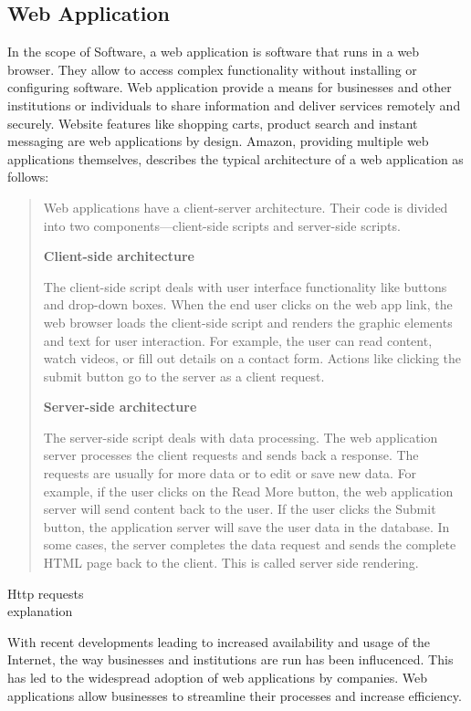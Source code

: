 \subsection{Web Application}
In the scope of Software, a web application is software that runs in a web browser. 
They allow to access complex functionality without installing or configuring software. 
Web application provide a means for businesses and other institutions or individuals to share information and deliver services remotely and securely. 
Website features like shopping carts, product search and instant messaging are web applications by design. \cite{aws/webapp}
Amazon, providing multiple web applications themselves, describes the typical architecture of a web application as follows: 
\begin{quote}
Web applications have a client-server architecture. 
Their code is divided into two components—client-side scripts and server-side scripts.  


\textbf{Client-side architecture}


The client-side script deals with user interface functionality like buttons and drop-down boxes.
When the end user clicks on the web app link, the web browser loads the client-side script and renders the graphic elements and text for user interaction.
For example, the user can read content, watch videos, or fill out details on a contact form.
Actions like clicking the submit button go to the server as a client request.


\textbf{Server-side architecture}


The server-side script deals with data processing.
The web application server processes the client requests and sends back a response.
The requests are usually for more data or to edit or save new data.
For example, if the user clicks on the Read More button, the web application server will send content back to the user.
If the user clicks the Submit button, the application server will save the user data in the database.
In some cases, the server completes the data request and sends the complete HTML page back to the client.
This is called server side rendering. \cite{aws/webapp}
\end{quote}
{\color{red} Http requests \\ explanation}


With recent developments leading to increased availability and usage of the Internet, the way businesses and institutions are run has been influcenced.
This has led to the widespread adoption of web applications by companies.
Web applications allow businesses to streamline their processes and increase efficiency. \cite{stackpath/webapp}

